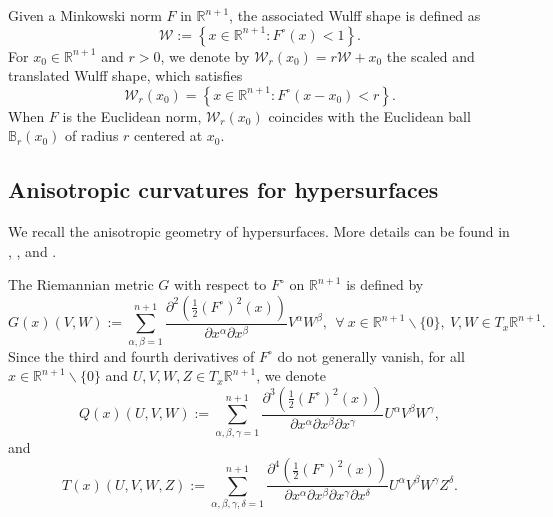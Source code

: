 \documentclass[10pt,a4paper]{amsart}
\numberwithin{equation}{section}
\begin{document}
	Given a Minkowski norm $F$ in $\mathbb{R}^{n+1}$, the associated Wulff shape is defined as
	\begin{equation*}
		\mathcal{W}:=\left\lbrace x\in\mathbb{R}^{n+1}:F^\circ(x)<1 \right\rbrace.
	\end{equation*}
	For $x_0\in \mathbb{R}^{n+1}$ and $r>0$, we denote by $\mathcal{W}_r(x_0)=r\mathcal{W}+x_0$ the scaled and translated Wulff shape, which satisfies
	\begin{equation*}
		\mathcal{W}_r(x_0)=\left\lbrace x\in\mathbb{R}^{n+1}:F^\circ(x-x_0)<r \right\rbrace.
	\end{equation*}
	When $F$ is the Euclidean norm, $\mathcal{W}_r(x_0)$ coincides with the Euclidean ball $\mathbb{B}_r(x_0)$ of radius $r$ centered at $x_0$.
	
	
	
	\subsection{Anisotropic curvatures for hypersurfaces}
	We recall the anisotropic geometry of hypersurfaces. More details can be found in \cite{Andrews01}, \cite{Xia12}, and \cite{Xia17}.
	
	The Riemannian metric $G$ with respect to $F^{\circ}$ on $\mathbb{R}^{n+1}$ is defined by
	\begin{equation*}
		G(x)(V,W):=\sum\limits_{\alpha,\beta=1}^{n+1} \dfrac{\partial^2 \left( \frac{1}{2}\left(F^{\circ}\right)^2(x) \right)}{\partial x^{\alpha}\partial x^{\beta}} V^{\alpha}W^{\beta},\ \ \forall\ x\in\mathbb{R}^{n+1}\backslash\{0\},\ V,W\in T_{x}\mathbb{R}^{n+1}.
	\end{equation*}
	Since the third and fourth derivatives of $F^{\circ}$ do not generally vanish, for all $x\in\mathbb{R}^{n+1}\backslash\{0\}$ and $U,V,W,Z\in T_{x}\mathbb{R}^{n+1}$, we denote
	\begin{equation*}
		Q(x)(U,V,W):= \sum\limits_{\alpha,\beta,\gamma=1}^{n+1} \dfrac{\partial^3 \left( \frac{1}{2}\left(F^{\circ}\right)^2(x) \right)}{\partial x^{\alpha}\partial x^{\beta} \partial x^{\gamma}} U^{\alpha}V^{\beta}W^{\gamma},
	\end{equation*}
	and
	\begin{equation*}
		T(x)(U,V,W,Z) := \sum\limits_{\alpha,\beta,\gamma,\delta=1}^{n+1}\dfrac{\partial^4\left( \frac{1}{2}\left( F^{\circ} \right)^2(x) \right)}{\partial x^{\alpha}\partial x^{\beta}\partial x^{\gamma}\partial x^{\delta}}U^{\alpha}V^{\beta}W^{\gamma}Z^{\delta}.
	\end{equation*}
	
\end{document}
